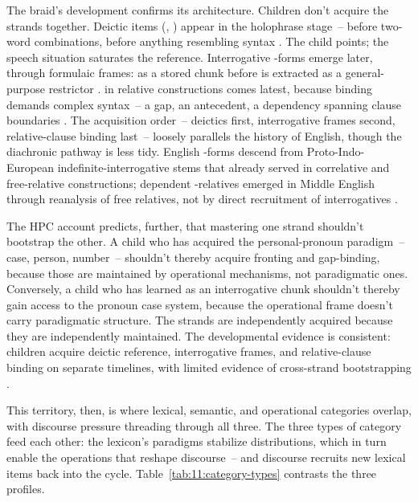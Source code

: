 The braid's development confirms its architecture. Children don't acquire the strands together. Deictic items (, ) appear in the holophrase stage~-- before two-word combinations, before anything resembling syntax \autocite{clark1978,diessel1999}. The child points; the speech situation saturates the reference. Interrogative -forms emerge later, through formulaic frames:  as a stored chunk before  is extracted as a general-purpose restrictor \autocite{tomasello2003,rowlandpine2000}.  in relative constructions comes latest, because binding demands complex syntax~-- a gap, an antecedent, a dependency spanning clause boundaries \autocite{diessel2004}. The acquisition order~-- deictics first, interrogative frames second, relative-clause binding last~-- loosely parallels the history of English, though the diachronic pathway is less tidy. English -forms descend from Proto-Indo-European indefinite-interrogative stems that already served in correlative and free-relative constructions; dependent -relatives emerged in Middle English through reanalysis of free relatives, not by direct recruitment of interrogatives \autocite{gisbornetruswell2017}.

The HPC account predicts, further, that mastering one strand shouldn't bootstrap the other. A child who has acquired the personal-pronoun paradigm~-- case, person, number~-- shouldn't thereby acquire fronting and gap-binding, because those are maintained by operational mechanisms, not paradigmatic ones. Conversely, a child who has learned  as an interrogative chunk shouldn't thereby gain access to the pronoun case system, because the operational frame doesn't carry paradigmatic structure. The strands are independently acquired because they are independently maintained. The developmental evidence is consistent: children acquire deictic reference, interrogative frames, and relative-clause binding on separate timelines, with limited evidence of cross-strand bootstrapping \autocite{diessel2004}.

This territory, then, is where lexical, semantic, and operational categories overlap, with discourse pressure threading through all three. The three types of category feed each other: the lexicon's paradigms stabilize distributions, which in turn enable the operations that reshape discourse~-- and discourse recruits new lexical items back into the cycle. Table~\ref{tab:11:category-types} contrasts the three profiles.

